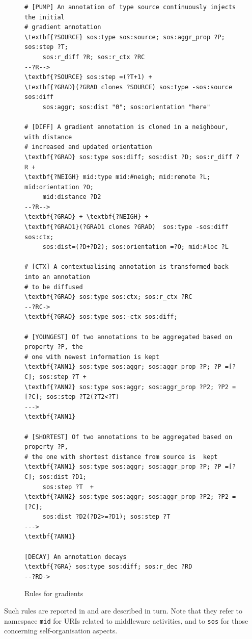 \documentclass[12pt,a4paper,twoside,openright]{book}
\begin{document}
\begin{figure}\vspace{10pt}
{\footnotesize
\begin{Verbatim}[samepage=true, frame=single, commandchars=\\\{\}, label={\small \bf Transition Rules for Gradients}]
# [PUMP] An annotation of type source continuously injects the initial
# gradient annotation
\textbf{?SOURCE} sos:type sos:source; sos:aggr_prop ?P; sos:step ?T;
     sos:r_diff ?R; sos:r_ctx ?RC
--?R--> 
\textbf{?SOURCE} sos:step =(?T+1) +
\textbf{?GRAD}(?GRAD clones ?SOURCE) sos:type -sos:source sos:diff
     sos:aggr; sos:dist "0"; sos:orientation "here"

# [DIFF] A gradient annotation is cloned in a neighbour, with distance
# increased and updated orientation
\textbf{?GRAD} sos:type sos:diff; sos:dist ?D; sos:r_diff ?R +
\textbf{?NEIGH} mid:type mid:#neigh; mid:remote ?L; mid:orientation ?O;
     mid:distance ?D2
--?R-->
\textbf{?GRAD} + \textbf{?NEIGH} +
\textbf{?GRAD1}(?GRAD1 clones ?GRAD)  sos:type -sos:diff sos:ctx;
     sos:dist=(?D+?D2); sos:orientation =?O; mid:#loc ?L

# [CTX] A contextualising annotation is transformed back into an annotation
# to be diffused
\textbf{?GRAD} sos:type sos:ctx; sos:r_ctx ?RC
--?RC->
\textbf{?GRAD} sos:type sos:-ctx sos:diff;

# [YOUNGEST] Of two annotations to be aggregated based on property ?P, the
# one with newest information is kept
\textbf{?ANN1} sos:type sos:aggr; sos:aggr_prop ?P; ?P =[?C]; sos:step ?T +
\textbf{?ANN2} sos:type sos:aggr; sos:aggr_prop ?P2; ?P2 =[?C]; sos:step ?T2(?T2<?T)
--->
\textbf{?ANN1}

# [SHORTEST] Of two annotations to be aggregated based on property ?P,
# the one with shortest distance from source is  kept
\textbf{?ANN1} sos:type sos:aggr; sos:aggr_prop ?P; ?P =[?C]; sos:dist ?D1;
     sos:step ?T  +
\textbf{?ANN2} sos:type sos:aggr; sos:aggr_prop ?P2; ?P2 =[?C];
     sos:dist ?D2(?D2>=?D1); sos:step ?T
--->
\textbf{?ANN1}

[DECAY] An annotation decays
\textbf{?GRA} sos:type sos:diff; sos:r_dec ?RD
--?RD->

\end{Verbatim}
}
\vspace{-10pt}\caption{Rules for gradients}\label{laws:gradient}
\end{figure}

Such rules are reported in  and are described in turn.
%
Note that they refer to namespace \texttt{mid} for URIs related to middleware activities, and to \texttt{sos} for those concerning self-organisation aspects.
\end{document}
